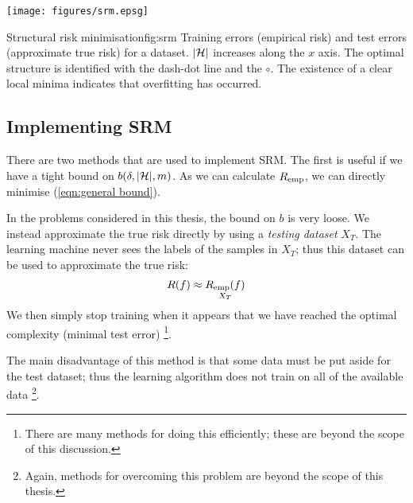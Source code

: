 \begin{linefigure}
\begin{center}
\texttt{[image: figures/srm.epsg]}
\end{center}
\begin{capt}{Structural risk minimisation}{fig:srm}
Training errors (empirical risk) and test errors (approximate true
risk) for a dataset.  $|\mathcal{H}|$ increases along the $x$ axis.
The optimal structure is identified with the dash-dot line and the
$\circ$.  The existence of a clear local minima indicates that
overfitting has occurred.
\end{capt}
\end{linefigure}


\subsection{Implementing SRM}

There are two methods that are used to implement SRM.  The first
is useful if we have a tight bound on $b(\delta, |\mathcal{H}|, m)$.  As we
can calculate $R_{\mathrm{emp}}$, we can directly minimise (\ref{eqn:general
bound}).

In the problems considered in this thesis, the bound on $b$ is very
loose.  We instead approximate the true risk directly by using a
\emph{testing dataset} $X_T$.  The learning machine never sees the
labels of the samples in $X_T$; thus this dataset can be used to
approximate the true risk:
%
\begin{equation}
R(f) \approx \underset{X_T}{R_{\mathrm{emp}}(f)}
\end{equation}
%
We then simply stop training when it appears that we have reached the
optimal complexity (minimal test error)%
\footnote{There are many methods for doing this efficiently;
these are beyond the scope of this discussion.}.

The main disadvantage of this method is that some data must be put
aside for the test dataset; thus the learning algorithm does not train
on all of the available data%
\footnote{Again, methods for overcoming this problem are beyond the
scope of this thesis.}.

